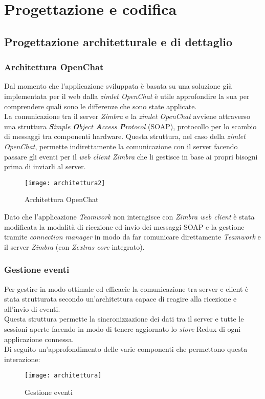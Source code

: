\chapter{Progettazione e codifica }\label{chap:design}

\section {Progettazione architetturale e di dettaglio}
\subsection{Architettura OpenChat}
Dal momento che l'applicazione sviluppata è basata su una soluzione già implementata per il web dalla \emph{zimlet OpenChat} è utile approfondire la sua  per comprendere quali sono le differenze che sono state applicate.\\
La comunicazione tra il server \emph{Zimbra} e la \emph{zimlet OpenChat} avviene attraverso una struttura \emph{\textbf{S}imple \textbf{O}bject \textbf{A}ccess \textbf{P}rotocol} (\acrshort{SOAP}), protocollo per lo scambio di messaggi tra componenti hardware.
Questa struttura, nel caso della \emph{zimlet OpenChat}, permette indirettamente la comunicazione con il server facendo passare gli eventi per il \emph{web client Zimbra} che li gestisce in base ai propri bisogni prima di inviarli al server. \\
\begin{figure}[H] 
	\centering
	\texttt{[image: architettura2]}
	\caption{Architettura OpenChat}
\end{figure}
Dato che l'applicazione \emph{Teamwork} non interagisce con \emph{Zimbra web client} è stata modificata la modalità di ricezione ed invio dei messaggi SOAP e la gestione tramite \emph{connection manager} in modo da far comunicare direttamente \emph{Teamwork} e il server \emph{Zimbra} (con \emph{Zextras core} integrato).

\subsection{Gestione eventi}
Per gestire in modo ottimale ed efficacie la comunicazione tra server e client è stata strutturata secondo un'architettura capace di reagire alla ricezione e all'invio di eventi. \\
Questa struttura permette la sincronizzazione dei dati tra il server e tutte le sessioni aperte facendo in modo di tenere aggiornato lo \emph{store} Redux di ogni applicazione connessa.\\
Di seguito un'approfondimento delle varie componenti che permettono questa interazione:
\begin{figure}[H] 
	\centering
	\texttt{[image: architettura]}
	\caption{Gestione eventi}
\end{figure}
